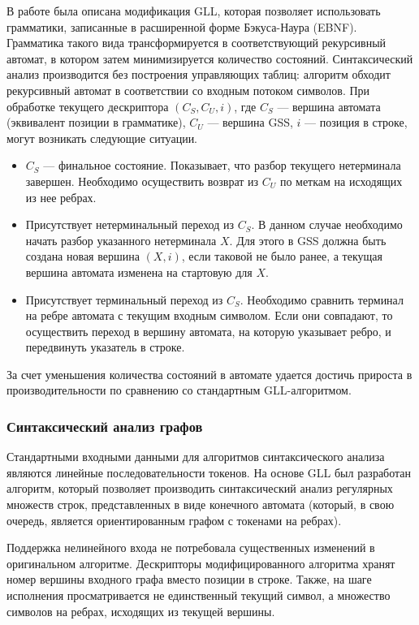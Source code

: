В работе \cite{Gorokhov2017ebnf} была описана модификация GLL, которая позволяет использовать грамматики, записанные в расширенной форме Бэкуса-Наура (EBNF). Грамматика такого вида трансформируется в соответствующий рекурсивный автомат, в котором затем минимизируется количество состояний. Синтаксический анализ производится без построения управляющих таблиц: алгоритм обходит рекурсивный автомат в соответствии со входным потоком символов. При обработке текущего дескриптора $(C_S, C_U, i)$, где $C_S$ --- вершина автомата (эквивалент позиции в грамматике), $C_U$ --- вершина GSS, $i$ --- позиция в строке, могут возникать следующие ситуации.

\begin{itemize}
	\item $C_S$ --- финальное состояние. Показывает, что разбор текущего нетерминала завершен. Необходимо осуществить возврат из $C_U$ по меткам на исходящих из нее ребрах.
	\item Присутствует нетерминальный переход из $C_S$. В данном случае необходимо начать разбор указанного нетерминала $X$. Для этого в GSS должна быть создана новая вершина $(X, i)$, если таковой не было ранее, а текущая вершина автомата изменена на стартовую для $X$.
	\item Присутствует терминальный переход из $C_S$. Необходимо сравнить терминал на ребре автомата с текущим входным символом. Если они совпадают, то осуществить переход в вершину автомата, на которую указывает ребро, и передвинуть указатель в строке.
\end{itemize}

За счет уменьшения количества состояний в автомате удается достичь прироста в производительности по сравнению со стандартным GLL-алгоритмом.

\subsubsection{Синтаксический анализ графов}

Стандартными входными данными для алгоритмов синтаксического анализа являются линейные последовательности токенов. На основе GLL был разработан алгоритм, который позволяет производить синтаксический анализ регулярных множеств строк, представленных в виде конечного автомата (который, в свою очередь, является ориентированным графом с токенами на ребрах).

Поддержка нелинейного входа не потребовала существенных изменений в оригинальном алгоритме. Дескрипторы модифицированного алгоритма хранят номер вершины входного графа вместо позиции в строке. Также, на шаге исполнения просматривается не единственный текущий символ, а множество символов на ребрах, исходящих из текущей вершины.


